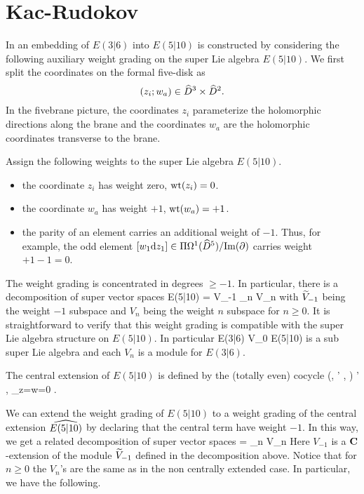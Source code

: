 

%

\section{Kac-Rudokov}

In \cite{KacRudakov} an embedding of $E(3|6)$ into $E(5|10)$ is constructed by considering the following auxiliary weight grading on the super Lie algebra $E(5|10)$. 
We first split the coordinates on the formal five-disk as
\[
(z_i ; w_a) \in \Hat{D}^3 \times \Hat{D}^2 .
\]
In the fivebrane picture, the coordinates $z_i$ parameterize the holomorphic directions along the brane and the coordinates $w_a$ are the holomorphic coordinates transverse to the brane.

\parsec[s:e510weight]
Assign the following weights to the super Lie algebra $E(5|10)$. 
\begin{itemize} 
\item the coordinate $z_i$ has weight zero, $\wt(z_i) = 0$. 
\item the coordinate $w_a$ has weight $+1$, $\wt(w_a) = +1$. 
\item the parity of an element carries an additional weight of $-1$. 
Thus, for example, the odd element $[w_1 \d z_1] \in \Pi \Omega^1(\Hat{D}^5)/{\rm Im}(\del)$ carries weight $+1 - 1 = 0$. 
\end{itemize} 
The weight grading is concentrated in degrees $\geq -1$. 
In particular, there is a decomposition of super vector spaces
\beqn\label{eqn:decomp1}
E(5|10) = \til V_{-1} \times \prod_{n } V_n 
\eeqn
with $\til V_{-1}$ being the weight $-1$ subspace and $V_n$ being the weight $n$ subspace for $n \geq 0$.  
It is straightforward to verify that this weight grading is compatible with the super Lie algebra structure on $E(5|10)$. 
In particular 
\beqn 
\label{eqn:e36iso}
E(3|6) \cong V_0 \subset E(5|10)
\eeqn
is a sub super Lie algebra and each $V_n$ is a module for $E(3|6)$. 

\parsec[s:e510central]

The central extension of $E(5|10)$ is defined by the (totally even) cocycle
\beqn\label{eqn:e510central}
(\mu, \mu' , \alpha) \mapsto \<\mu \wedge \mu' , \alpha\>_{z=w=0} .
\eeqn

We can extend the weight grading of $E(5|10)$ to a weight grading of the central extension $\Hat{E(5|10)}$ by declaring that the central term have weight $-1$.
In this way, we get a related decomposition of super vector spaces
\beqn\label{eqn:decomp1}
 = \prod_{n } V_n
\eeqn
Here $V_{-1}$ is a $\C$-extension of the module $\til V_{-1}$ defined in the decomposition above.
Notice that for $n \geq 0$ the $V_n$'s are the same as in the non centrally extended case.
In particular, we have the following. 

